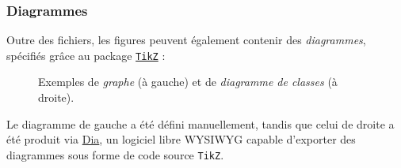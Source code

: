 \documentclass[10pt,    %
    french,             %
    xcolor=table,       %
    envcountsect,       %
    aspectratio=43      %
]{beamer}
\begin{document}
\begin{frame}
    \frametitle{Diagrammes}
    Outre des fichiers, les figures peuvent également contenir des \textit{diagrammes}, spécifiés grâce au package \href{https://ctan.org/pkg/pgf?lang=en}{\texttt{TikZ}} :

    \vspace{-0.2cm}
    \begin{figure}[H]
        \centering
        \resizebox{0.35\linewidth}{!}{}
        \hspace{0.25cm}\hspace{0.25cm}
        \resizebox{0.45\linewidth}{!}{}
        \vspace{-0.3cm}
        \caption{Exemples de \textit{graphe} (à gauche) et de \textit{diagramme de classes} (à droite).}
        \label{fig:diagrams}
    \end{figure}
    
    \vspace{-0.6cm}
    Le diagramme de gauche a été défini manuellement, tandis que celui de droite a été produit via \href{http://dia-installer.de}{Dia}, un logiciel libre WYSIWYG capable d'exporter des diagrammes sous forme de code source \texttt{TikZ}.
    
    
\end{frame}
    
\end{document}
